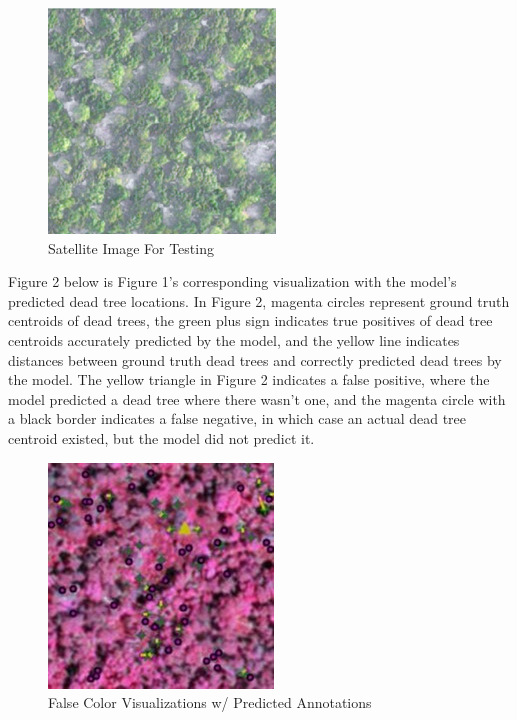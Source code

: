 \documentclass[conference]{ieeetran}
\begin{document}
\begin{figure}[htbp]
  \centering
  \includegraphics[width=0.75\linewidth]{Picture1.png}
  \caption{Satellite Image For Testing}
  \label{fig:my_label}
\end{figure}

 Figure 2 below is Figure 1's corresponding visualization with the model's predicted dead tree locations. In Figure 2, magenta circles represent ground truth centroids of dead trees, the green plus sign indicates true positives of dead tree centroids accurately predicted by the model, and the yellow line indicates distances between ground truth dead trees and correctly predicted dead trees by the model. The yellow triangle in Figure 2 indicates a false positive, where the model predicted a dead tree where there wasn't one, and the magenta circle with a black border indicates a false negative, in which case an actual dead tree centroid existed, but the model did not predict it.

\begin{figure}[htbp]
  \centering
  \includegraphics[width=0.75\linewidth]{Picture2.jpg}
  \caption{False Color Visualizations w/ Predicted Annotations}
  \label{fig:my_label}
\end{figure}
\end{document}
